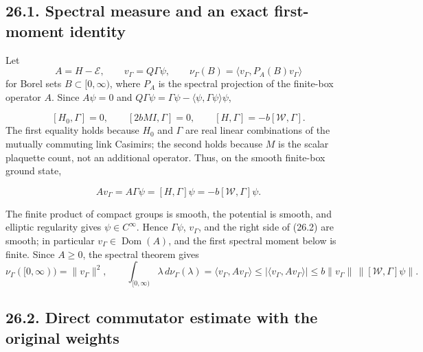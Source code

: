 \documentclass[
]{article}
\begin{document}
\subsection{26.1. Spectral measure and an exact first-moment
identity}\label{spectral-measure-and-an-exact-first-moment-identity}

Let \[
 A=H-\mathcal E,\qquad v_\Gamma=Q\Gamma\psi,\qquad
 \nu_\Gamma(B)=\langle v_\Gamma,P_A(B)v_\Gamma\rangle
 \tag{26.1}
\] for Borel sets \(B\subset[0,\infty)\), where \(P_A\) is the spectral
projection of the finite-box operator \(A\). Since \(A\psi=0\) and
\(Q\Gamma\psi=\Gamma\psi-\langle\psi,\Gamma\psi\rangle\psi\),

\[
[H_0,\Gamma]=0,
\qquad [2bM I,\Gamma]=0,
\qquad [H,\Gamma]=-b[\mathcal W,\Gamma].
\] The first equality holds because \(H_0\) and \(\Gamma\) are real
linear combinations of the mutually commuting link Casimirs; the second
holds because \(M\) is the scalar plaquette count, not an additional
operator. Thus, on the smooth finite-box ground state,

\[
 A v_\Gamma=A\Gamma\psi=[H,\Gamma]\psi
 =-b[\mathcal W,\Gamma]\psi .
 \tag{26.2}
\]

The finite product of compact groups is smooth, the potential is smooth,
and elliptic regularity gives \(\psi\in C^\infty\). Hence
\(\Gamma\psi\), \(v_\Gamma\), and the right side of (26.2) are smooth;
in particular \(v_\Gamma\in\operatorname{Dom}(A)\), and the first
spectral moment below is finite. Since \(A\ge0\), the spectral theorem
gives \[
 \nu_\Gamma([0,\infty))=\|v_\Gamma\|^2,\qquad
 \int_{[0,\infty)}\lambda\,d\nu_\Gamma(\lambda)
 =\langle v_\Gamma,Av_\Gamma\rangle
 \le \left|\langle v_\Gamma,Av_\Gamma\rangle\right|
 \le b\|v_\Gamma\|\,\|[\mathcal W,\Gamma]\psi\|.
 \tag{26.3}
\]

\subsection{26.2. Direct commutator estimate with the original
weights}\label{direct-commutator-estimate-with-the-original-weights}
\end{document}
